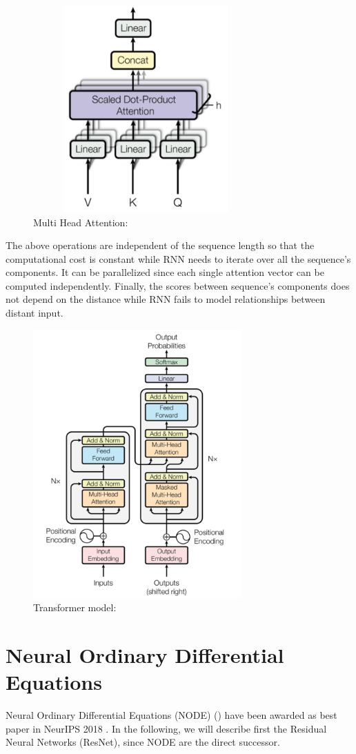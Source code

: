 \documentclass[LaM,binding=0.6cm]{sapthesis}
\begin{document}
\begin{figure}   \centering
    \includegraphics[width=80mm,scale=0.7]{mhsa}
    \caption{Multi Head Attention: \cite{aiayn}}
    \label{fig:mhsa}
\end{figure}
The above operations are independent of the sequence length so that the computational cost is constant while RNN needs to iterate over all the sequence's components. It can be parallelized since each single attention vector can be computed independently. Finally, the scores between sequence's components does not depend on the distance while RNN fails to model relationships between distant input.
\begin{figure}   \centering
    \includegraphics[width=80mm,scale=1]{transflay}
    \caption{Transformer model: \cite{aiayn}}
    \label{fig:tramodel}
\end{figure}
\section{Neural Ordinary Differential Equations}
Neural Ordinary Differential Equations (NODE) (\cite{DBLP:journals/corr/abs-1806-07366}) have been awarded as best paper in NeurIPS 2018 . In the following, we will describe first the Residual Neural Networks (ResNet), since NODE are the direct successor.
\end{document}
